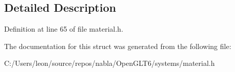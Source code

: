 \subsection{Detailed Description}


Definition at line 65 of file material.\+h.



The documentation for this struct was generated from the following file\+:\begin{DoxyCompactItemize}
\item 
C\+:/\+Users/leon/source/repos/nabla/\+Open\+G\+L\+T6/systems/material.\+h\end{DoxyCompactItemize}
